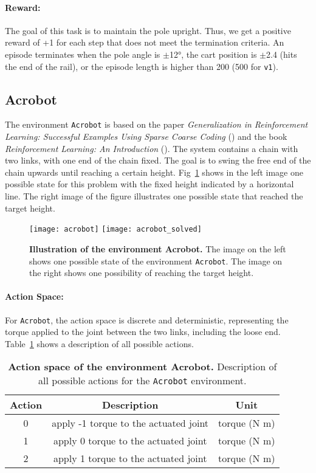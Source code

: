 \paragraph*{Reward:} The goal of this task is to maintain the pole upright. Thus, we get a positive reward of +1 for each step that does not meet the termination criteria. An episode terminates when the pole angle is $\pm$12°, the cart position is $\pm$2.4 (hits the end of the rail), or the episode length is higher than 200 (500 for \verb|v1|).

\subsection{Acrobot}
The environment \verb|Acrobot| is based on the paper \emph{Generalization in Reinforcement Learning: Successful Examples Using Sparse Coarse Coding} (\cite{NIPS1995_8f1d4362}) and the book \emph{Reinforcement Learning: An Introduction} (\cite{montague1999reinforcement}). The system contains a chain with two links, with one end of the chain fixed. The goal is to swing the free end of the chain upwards until reaching a certain height. Fig~\ref{fig:acrobot} shows in the left image one possible state for this problem with the fixed height indicated by a horizontal line. The right image of the figure illustrates one possible state that reached the target height.
\begin{figure}[!ht]
  \centering
\texttt{[image: acrobot]} \hspace*{10mm} \texttt{[image: acrobot\_solved]}
\caption[Illustration of the environment Acrobot]{
  \textbf{Illustration of the environment Acrobot.}
  The image on the left shows one possible state of the environment \texttt{Acrobot}. The image on the right shows one possibility of reaching the target height.
}
\label{fig:acrobot}
\end{figure}

\paragraph*{Action Space:} For \verb|Acrobot|, the action space is discrete and deterministic, representing the torque applied to the joint between the two links, including the loose end. Table~\ref{table:acrobot_act} shows a description of all possible actions.
\begin{table}[!ht]
  \centering
  \begin{tabular}{ |c|c|c| }
    \hline
    Action & Description & Unit \\
    \hline
    0 & apply -1 torque to the actuated joint & torque (N m) \\
    1 & apply 0 torque to the actuated joint & torque (N m) \\
    2 & apply 1 torque to the actuated joint & torque (N m) \\
    \hline
  \end{tabular}
  \caption[Action space of the environment Acrobot]{
    \textbf{Action space of the environment Acrobot.}
    Description of all possible actions for the \texttt{Acrobot} environment.
  }
  \label{table:acrobot_act}
\end{table}

